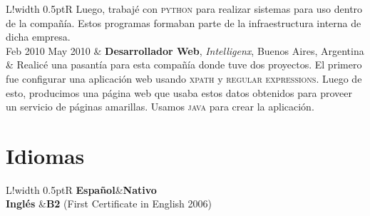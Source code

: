 \documentclass[10pt]{article}
\newcommand\VRule{\color{lightgray}\vrule width 0.5pt}
\begin{document}
\begin{tabular}{L!{\VRule}R}
Luego, trabajé con \textsc{python} para realizar sistemas para uso 
dentro de la compañía. Estos programas
formaban parte de la infraestructura interna de dicha empresa.\\


Feb 2010 May 2010 & \textbf{Desarrollador Web}, \textit{Intelligenx}, Buenos Aires, Argentina\\
& \vspace{-0.7cm} Realicé una pasantía para esta compañía donde tuve dos proyectos.
El primero fue configurar una aplicación web usando \textsc{xpath} y 
\textsc{regular expressions}.
Luego de esto, producimos una página web que usaba estos datos obtenidos para proveer un servicio de páginas amarillas.
Usamos \textsc{java} para crear la aplicación.\\
\end{tabular}



\section*{Idiomas}

\begin{tabular}{L!{\VRule}R}
{\bf Español}&{\bf Nativo}\\
{\bf Inglés} &{\bf B2} (First Certificate in English 2006)\\
\end{tabular}
\end{document}
